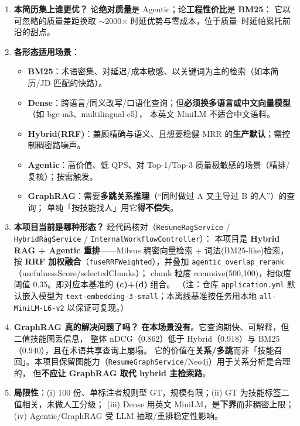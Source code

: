 \documentclass[11pt,a4paper,fontset=windows]{ctexart}
\newcommand{\best}[1]{\textbf{\textcolor{hl}{#1}}}
\begin{document}
\begin{enumerate}
\item \textbf{本简历集上谁更优？} 论\textbf{绝对质量}是 Agentic；论\textbf{工程性价比}是 \best{BM25}：
      它以可忽略的质量差距换取 $\sim$2000$\times$ 时延优势与零成本，位于质量–时延帕累托前沿的甜点。
\item \textbf{各形态适用场景}：
   \begin{itemize}
   \item \textbf{BM25}：术语密集、对延迟/成本敏感、以关键词为主的检索（如本简历/JD 匹配的快路）。
   \item \textbf{Dense}：跨语言/同义改写/口语化查询；但\textbf{必须换多语言或中文向量模型}（如 bge-m3、multilingual-e5），
         本英文 MiniLM 不适合中文语料。
   \item \textbf{Hybrid(RRF)}：兼顾精确与语义、且想要稳健 MRR 的\textbf{生产默认}；需控制稠密路噪声。
   \item \textbf{Agentic}：高价值、低 QPS、对 Top-1/Top-3 质量极敏感的场景（精排/复核）；按需触发。
   \item \textbf{GraphRAG}：需要\textbf{多跳关系推理}（“同时做过 A 又主导过 B 的人”）的查询；
         单纯「按技能找人」用它\textbf{得不偿失}。
   \end{itemize}
\item \textbf{本项目当前是哪种形态？} 经代码核对（\texttt{ResumeRagService} / \texttt{HybridRagService} / \texttt{InternalWorkflowController}）：
      本项目是 \best{Hybrid RAG + Agentic 重排}——Milvus 稠密向量检索 + 词法(BM25-like)检索，
      按 \textbf{RRF 加权融合}（\texttt{fuseRRFWeighted}），并叠加 \texttt{agentic\_overlap\_rerank}（usefulnessScore/selectedChunks）；
      chunk 粒度 recursive(500,100)，相似度阈值 0.35。即对应本基准的 \textbf{(c)+(d)} 组合。
      （注：仓库 \texttt{application.yml} 默认嵌入模型为 \texttt{text-embedding-3-small}；本离线基准按任务用本地 \texttt{all-MiniLM-L6-v2} 以保证可复现。）
\item \textbf{GraphRAG 真的解决问题了吗？} \textbf{在本场景没有}。它查询期快、可解释，但二值技能图丢信息，
      整体 nDCG（0.862）低于 Hybrid（0.918）与 BM25（0.940），且在术语共享查询上崩塌。
      它的价值在\textbf{关系/多跳}而非「技能召回」。本项目保留图能力（\texttt{ResumeGraphService}/Neo4j）用于关系分析是合理的，
      但\textbf{不应让 GraphRAG 取代 hybrid 主检索路}。
\item \textbf{局限性}：(i) 100 份、单标注者规则型 GT，规模有限；(ii) GT 为技能标签二值相关，未做人工分级；
      (iii) Dense 用英文 MiniLM，是\textbf{下界}而非稠密上限；(iv) Agentic/GraphRAG 受 LLM 抽取/重排稳定性影响。
\end{enumerate}
\end{document}
